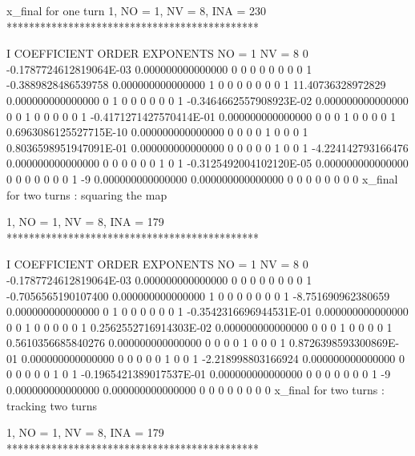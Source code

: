 \documentclass{hitec}     %
\begin{document}
{{    \begin{code}
x_final for one turn
          1, NO =    1, NV =    8, INA =  230
 *********************************************

    I  COEFFICIENT          ORDER   EXPONENTS
      NO =     1      NV =     8
   0 -0.1787724612819064E-03   0.000000000000000       0  0  0  0  0  0  0  0
   1 -0.3889828486539758       0.000000000000000       1  0  0  0  0  0  0  0
   1   11.40736328972829       0.000000000000000       0  1  0  0  0  0  0  0
   1 -0.3464662557908923E-02   0.000000000000000       0  0  1  0  0  0  0  0
   1 -0.4171271427570414E-01   0.000000000000000       0  0  0  1  0  0  0  0
   1  0.6963086125527715E-10   0.000000000000000       0  0  0  0  1  0  0  0
   1  0.8036598951947091E-01   0.000000000000000       0  0  0  0  0  1  0  0
   1  -4.224142793166476       0.000000000000000       0  0  0  0  0  0  1  0
   1 -0.3125492004102120E-05   0.000000000000000       0  0  0  0  0  0  0  1
    -9   0.000000000000000       0.000000000000000       0  0  0  0  0  0  0  0
 x_final for two turns : squaring the map

          1, NO =    1, NV =    8, INA =  179
 *********************************************

    I  COEFFICIENT          ORDER   EXPONENTS
      NO =     1      NV =     8
   0 -0.1787724612819064E-03   0.000000000000000       0  0  0  0  0  0  0  0
   1 -0.7056565190107400       0.000000000000000       1  0  0  0  0  0  0  0
   1  -8.751690962380659       0.000000000000000       0  1  0  0  0  0  0  0
   1 -0.3542316696944531E-01   0.000000000000000       0  0  1  0  0  0  0  0
   1  0.2562552716914303E-02   0.000000000000000       0  0  0  1  0  0  0  0
   1  0.5610356685840276       0.000000000000000       0  0  0  0  1  0  0  0
   1  0.8726398593300869E-01   0.000000000000000       0  0  0  0  0  1  0  0
   1  -2.218998803166924       0.000000000000000       0  0  0  0  0  0  1  0
   1 -0.1965421389017537E-01   0.000000000000000       0  0  0  0  0  0  0  1
    -9   0.000000000000000       0.000000000000000       0  0  0  0  0  0  0  0
 x_final for two turns : tracking two turns

          1, NO =    1, NV =    8, INA =  179
 *********************************************


\end{code}}}
\end{document}
